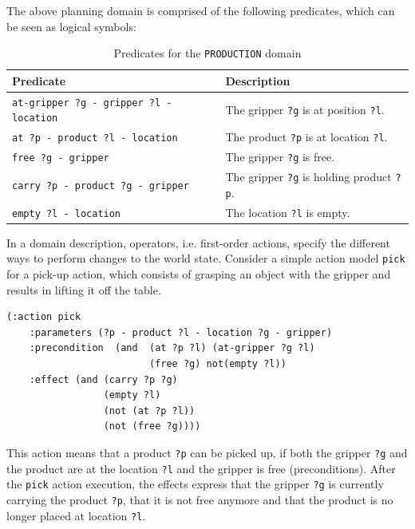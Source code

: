 The above planning domain is comprised of the following predicates, which can be seen as logical symbols:

\begin{table}[h]
\begin{center}
\begin{tabular}{l|l}
Predicate & Description\\ \hline
\texttt{at-gripper ?g - gripper ?l - location} & The gripper \texttt{?g} is at position \texttt{?l}.\\
\texttt{at ?p - product ?l - location} & The product \texttt{?p} is at location \texttt{?l}.\\
\texttt{free ?g - gripper} & The gripper \texttt{?g} is free.\\
\texttt{carry ?p - product ?g - gripper} & The gripper \texttt{?g} is holding product \texttt{?p}.\\
\texttt{empty ?l - location} & The location \texttt{?l} is empty.\\
\end{tabular}
\end{center}
\label{tab:predicates}
\caption{Predicates for the \texttt{PRODUCTION} domain}
\end{table}%


In a domain description, operators, i.e. first-order actions, specify the different ways to perform changes to the world state. 
Consider a simple action model \texttt{pick} for a pick-up action, which consists of grasping an object with the gripper and results in lifting it off the table.
\begin{verbatim}
(:action pick
    :parameters (?p - product ?l - location ?g - gripper)
    :precondition  (and  (at ?p ?l) (at-gripper ?g ?l) 
                         (free ?g) not(empty ?l))
    :effect (and (carry ?p ?g)
                 (empty ?l)
                 (not (at ?p ?l)) 
                 (not (free ?g))))
\end{verbatim}

This action means that a product \texttt{?p} can be picked up, if both the gripper \texttt{?g} and the product are at the location \texttt{?l} and the gripper is free (preconditions). After the \texttt{pick} action execution, the effects express that the gripper \texttt{?g} is currently carrying the product \texttt{?p}, that it is not free anymore and that the product is no longer placed at location \texttt{?l}.

